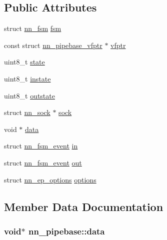\subsection*{Public Attributes}
\begin{DoxyCompactItemize}
\item 
struct \hyperlink{structnn__fsm}{nn\+\_\+fsm} \hyperlink{structnn__pipebase_a2df83f45bfd06e19ef9519e95e8c459d}{fsm}
\item 
const struct \hyperlink{structnn__pipebase__vfptr}{nn\+\_\+pipebase\+\_\+vfptr} $\ast$ \hyperlink{structnn__pipebase_aeafca3d6f7ede1312294d1b768130adb}{vfptr}
\item 
uint8\+\_\+t \hyperlink{structnn__pipebase_ae266ebdd9c1dcd033e997be9049e5861}{state}
\item 
uint8\+\_\+t \hyperlink{structnn__pipebase_a52c7c1a0428f1cd9b89f30217442ec36}{instate}
\item 
uint8\+\_\+t \hyperlink{structnn__pipebase_a47e77991eaa37e441330fb93bc86a3da}{outstate}
\item 
struct \hyperlink{structnn__sock}{nn\+\_\+sock} $\ast$ \hyperlink{structnn__pipebase_a9dd997f470c0632dd53246da77092c0c}{sock}
\item 
void $\ast$ \hyperlink{structnn__pipebase_a5c7369489ad75feab924e951478d1e21}{data}
\item 
struct \hyperlink{structnn__fsm__event}{nn\+\_\+fsm\+\_\+event} \hyperlink{structnn__pipebase_ad1ca938a85f997895828e920920ab6c6}{in}
\item 
struct \hyperlink{structnn__fsm__event}{nn\+\_\+fsm\+\_\+event} \hyperlink{structnn__pipebase_a1c450f3f6188b25f28ce8639dece4c90}{out}
\item 
struct \hyperlink{structnn__ep__options}{nn\+\_\+ep\+\_\+options} \hyperlink{structnn__pipebase_a3da55d5d4fd95032107b0e66286cf62b}{options}
\end{DoxyCompactItemize}


\subsection{Member Data Documentation}
\subsubsection[{data}]{\setlength{\rightskip}{0pt plus 5cm}void$\ast$ nn\+\_\+pipebase\+::data}\hypertarget{structnn__pipebase_a5c7369489ad75feab924e951478d1e21}{}\label{structnn__pipebase_a5c7369489ad75feab924e951478d1e21}
